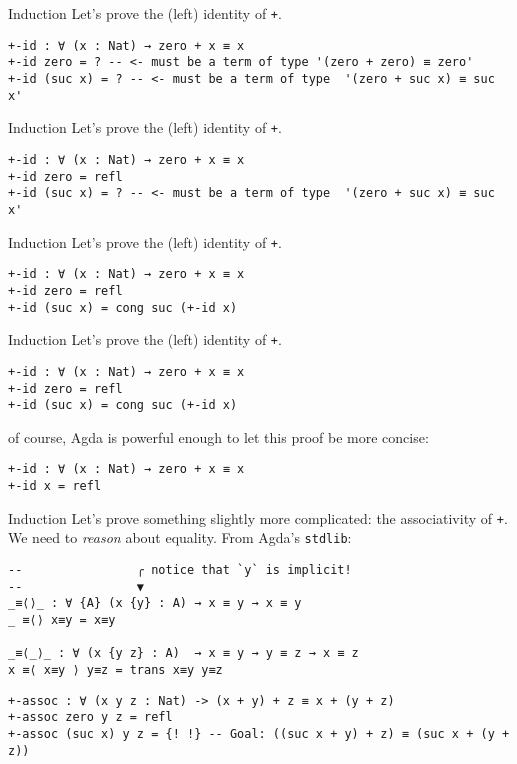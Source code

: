 \documentclass[t,aspectratio=169,9pt]{beamer}
\begin{document}
\begin{frame}[fragile]{Induction}
  Let's prove the (left) identity of \texttt{+}.
\begin{verbatim}
+-id : ∀ (x : Nat) → zero + x ≡ x
+-id zero = ? -- <- must be a term of type '(zero + zero) ≡ zero'
+-id (suc x) = ? -- <- must be a term of type  '(zero + suc x) ≡ suc x'
\end{verbatim}
\end{frame}
\begin{frame}{Induction}
  Let's prove the (left) identity of \texttt{+}.
\begin{verbatim}
+-id : ∀ (x : Nat) → zero + x ≡ x
+-id zero = refl
+-id (suc x) = ? -- <- must be a term of type  '(zero + suc x) ≡ suc x'
\end{verbatim}
\end{frame}
\begin{frame}{Induction}
  Let's prove the (left) identity of \texttt{+}.
\begin{verbatim}
+-id : ∀ (x : Nat) → zero + x ≡ x
+-id zero = refl
+-id (suc x) = cong suc (+-id x)
\end{verbatim}
\end{frame}
\begin{frame}{Induction}
  Let's prove the (left) identity of \texttt{+}.
\begin{verbatim}
+-id : ∀ (x : Nat) → zero + x ≡ x
+-id zero = refl
+-id (suc x) = cong suc (+-id x)
\end{verbatim}
of course, Agda is powerful enough to let this proof be more concise:
\begin{verbatim}
+-id : ∀ (x : Nat) → zero + x ≡ x
+-id x = refl
\end{verbatim}
\end{frame}
\begin{frame}[fragile]{Induction}
  Let's prove something slightly more complicated: the associativity of
  \texttt{+}. We need to {\it reason} about equality. From Agda's
  \texttt{stdlib}:
\begin{verbatim}
--                ╭ notice that `y` is implicit!
--                ▼
_≡⟨⟩_ : ∀ {A} (x {y} : A) → x ≡ y → x ≡ y
_ ≡⟨⟩ x≡y = x≡y

_≡⟨_⟩_ : ∀ (x {y z} : A)  → x ≡ y → y ≡ z → x ≡ z
x ≡⟨ x≡y ⟩ y≡z = trans x≡y y≡z
\end{verbatim}
\begin{verbatim}
+-assoc : ∀ (x y z : Nat) -> (x + y) + z ≡ x + (y + z)
+-assoc zero y z = refl
+-assoc (suc x) y z = {! !} -- Goal: ((suc x + y) + z) ≡ (suc x + (y + z))
\end{verbatim}
\end{frame}
\end{document}
